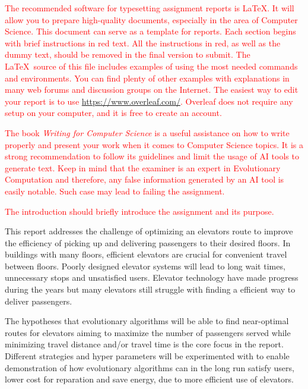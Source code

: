 \textcolor{red}{The recommended software for typesetting assignment reports is \LaTeX. It will allow you to prepare high-quality documents, especially in the area of Computer Science. This document can serve as a template for reports. Each section begins with brief instructions in red text. All the instructions in red, as well as the dummy text, should be removed in the final version to submit. The \LaTeX\ source of this file includes examples of using the most needed commands and environments. You can find plenty of other examples with explanations in many web forums and discussion groups on the Internet. The easiest way to edit your report is to use \url{https://www.overleaf.com/}. Overleaf does not require any setup on your computer, and it is free to create an account.}

\textcolor{red}{The book \textit{Writing for Computer Science} \cite{zobel2014writing} is a useful assistance on how to write properly and present your work when it comes to Computer Science topics. It is a strong recommendation to follow its guidelines and limit the usage of AI tools to generate text. Keep in mind that the examiner is an expert in Evolutionary Computation and therefore, any false information generated by an AI tool is easily notable. Such case may lead to failing the assignment.}

\textcolor{red}{The introduction should briefly introduce the assignment and its purpose.}

This report addresses the challenge of optimizing an elevators route to improve the efficiency of picking up and delivering passengers to their desired floors. In buildings with many floors, efficient elevators are crucial for convenient travel between floors. Poorly designed elevator systems will lead to long wait times, unnecessary stops and unsatisfied users. Elevator technology have made progress during the years but many elevators still struggle with finding a efficient way to deliver passengers.

The hypotheses that evolutionary algorithms will be able to find near-optimal routes for elevators aiming to maximize the number of passengers served while minimizing travel distance and/or travel time is the core focus in the report. Different strategies and hyper parameters will be experimented with to enable demonstration of how evolutionary algorithms can in the long run satisfy users, lower cost for reparation and save energy, due to more efficient use of elevators.